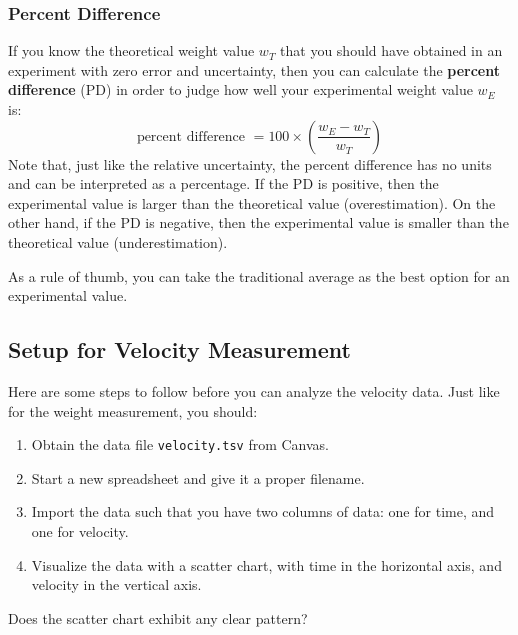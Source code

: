 \subsubsection{Percent Difference}
If you know the theoretical weight value $w_{T}$ that you should have obtained in an experiment with zero error and uncertainty, then you can calculate the \textbf{percent difference} (PD) in order to judge how well your experimental weight value $w_{E}$ is:
\begin{equation}
    \text{percent difference } = 100 \times \left( \frac{w_{E} - w_{T}}{w_{T}} \right)
\end{equation}
Note that, just like the relative uncertainty, the percent difference has no units and can be interpreted as a percentage. If the PD is positive, then the experimental value is larger than the theoretical value (overestimation). On the other hand, if the PD is negative, then the experimental value is smaller than the theoretical value (underestimation).

As a rule of thumb, you can take the traditional average as the best option for an experimental value.
\subsection{Setup for Velocity Measurement}
Here are some steps to follow before you can analyze the velocity data. Just like for the weight measurement, you should:
\begin{enumerate}
    \item Obtain the data file \texttt{velocity.tsv} from Canvas.
    \item Start a new spreadsheet and give it a proper filename.
    \item Import the data such that you have two columns of data: one for time, and one for velocity.
    \item Visualize the data with a scatter chart, with time in the horizontal axis, and velocity in the vertical axis.
\end{enumerate}
Does the scatter chart exhibit any clear pattern?
\begin{center}
\end{center}
